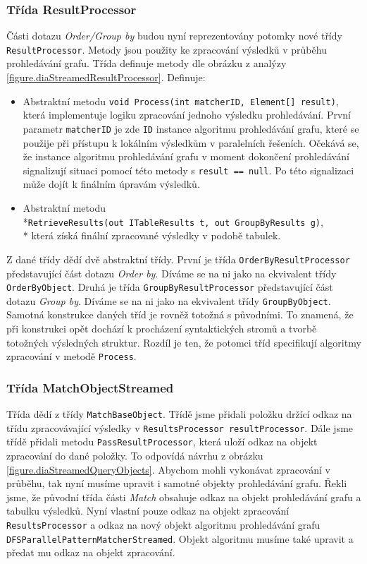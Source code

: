 \subsubsection{Třída ResultProcessor}

Části dotazu \textit{Order/Group by} budou nyní reprezentovány potomky nové třídy \texttt{ResultProcessor}.
Metody jsou použity ke zpracování výsledků v průběhu prohledávání grafu.
Třída definuje metody dle obrázku z analýzy \ref{figure.diaStreamedResultProcessor}.
Definuje:
\begin{itemize}
\item Abstraktní metodu \texttt{void Process(int matcherID, Element[] result)}, která implementuje logiku zpracování jednoho výsledku prohledávání.
První parametr \texttt{matcherID} je zde \texttt{ID} instance algoritmu prohledávání grafu, které se použije při přístupu k lokálním výsledkům v paralelních řešeních.
Očekává se, že instance algoritmu prohledávání grafu v moment dokončení prohledávání signalizují situaci pomocí této metody s \texttt{result == null}.
Po této signalizaci může dojít k finálním úpravám výsledků.
\item Abstraktní metodu \\*\texttt{RetrieveResults(out ITableResults t, out GroupByResults g)},\\* která získá finální zpracované výsledky v podobě tabulek. 
\end{itemize}
Z dané třídy dědí dvě abstraktní třídy.
První je třída \texttt{OrderByResultProcessor} představující část dotazu \textit{Order by}.
Díváme se na ni jako na ekvivalent třídy \texttt{OrderByObject}. 
Druhá je třída \texttt{GroupByResultProcessor} představující část dotazu \textit{Group by}.
Díváme se na ni jako na ekvivalent třídy \texttt{GroupByObject}.
Samotná konstrukce daných tříd je rovněž totožná s původními.
To znamená, že při konstrukci opět dochází k procházení syntaktických stromů a tvorbě totožných výsledných struktur.
Rozdíl je ten, že potomci tříd specifikují algoritmy zpracování v metodě \texttt{Process}.   

\subsubsection{Třída MatchObjectStreamed}

Třída dědí z třídy \texttt{MatchBaseObject}.
Třídě jsme přidali položku držící odkaz na třídu zpracovávající výsledky v \texttt{ResultsProcessor resultProcessor}.
Dále jsme třídě přidali metodu \texttt{PassResultProcessor}, která uloží odkaz na objekt zpracování do dané položky.
To odpovídá návrhu z obrázku \ref{figure.diaStreamedQueryObjects}.
Abychom mohli vykonávat zpracování v průběhu, tak nyní musíme upravit i samotné objekty prohledávání grafu.
Řekli jsme, že původní třída části \textit{Match} obsahuje odkaz na objekt prohledávání grafu a tabulku výsledků.
Nyní vlastní pouze odkaz na objekt zpracování \texttt{ResultsProcessor} a odkaz na nový objekt algoritmu prohledávání grafu \texttt{DFSParallelPatternMatcherStreamed}.
Objekt algoritmu musíme také upravit a předat mu odkaz na objekt zpracování.

